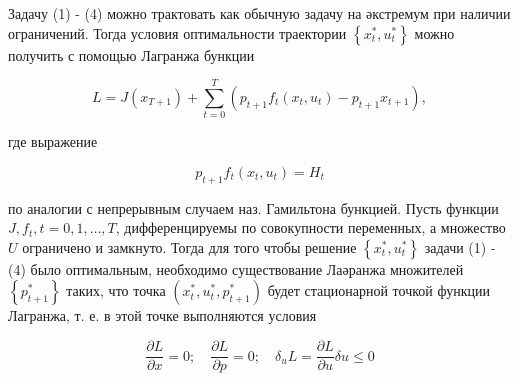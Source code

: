 \documentclass[10pt]{article}
\begin{document}
Задачу (1) - (4) можно трактовать как обычную задачу на әкстремум при наличии ограничений. Тогда условия оптимальности траектории $\left\{x_{t}^{*}, u_{t}^{*}\right\}$ можно получить с помощью Лагранжа бункции



\[

L=J\left(x_{T+1}\right)+\sum_{t=0}^{T}\left(p_{t+1} f_{t}\left(x_{t}, u_{t}\right)-p_{t+1} x_{t+1}\right),

\]



где выражение



\[

p_{t+1} f_{t}\left(x_{t}, u_{t}\right)=H_{t}

\]



по аналогии с непрерывным случаем наз. Гамильтона бункцией. Пусть функции $J, f_{t}, t=0,1, \ldots, T$, дифференцируемы по совокупности переменных, а множество $U$ ограничено и замкнуто. Тогда для того чтобы решение $\left\{x_{t}^{*}, u_{t}^{*}\right\}$ задачи (1) - (4) было оптимальным, необходимо существование Лаәранжа множителей $\left\{p_{t+1}^{*}\right\}$ таких, что точка $\left(x_{t}^{*}, u_{t}^{*}, p_{t+1}^{*}\right)$ будет стационарной точкой функции Лагранжа, т. е. в этой точке выполняются условия



\[

\frac{\partial L}{\partial x}=0 ; \quad \frac{\partial L}{\partial p}=0 ; \quad \delta_{u} L=\frac{\partial L}{\partial u} \delta u \leqslant 0

\]
\end{document}
